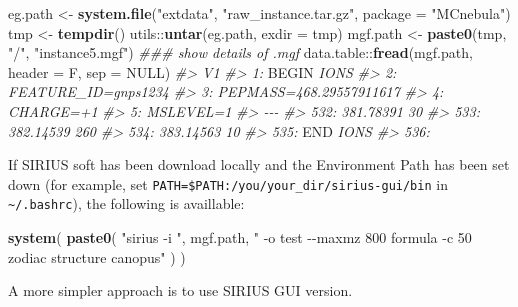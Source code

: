 \documentclass[]{tufte-handout}
\newenvironment{Shaded}{}{}
\newcommand{\CommentTok}[1]{\textcolor[rgb]{0.38,0.63,0.69}{\textit{#1}}}
\newcommand{\DataTypeTok}[1]{\textcolor[rgb]{0.56,0.13,0.00}{#1}}
\newcommand{\KeywordTok}[1]{\textcolor[rgb]{0.00,0.44,0.13}{\textbf{#1}}}
\newcommand{\NormalTok}[1]{#1}
\newcommand{\OperatorTok}[1]{\textcolor[rgb]{0.40,0.40,0.40}{#1}}
\newcommand{\OtherTok}[1]{\textcolor[rgb]{0.00,0.44,0.13}{#1}}
\newcommand{\RegionMarkerTok}[1]{#1}
\newcommand{\StringTok}[1]{\textcolor[rgb]{0.25,0.44,0.63}{#1}}
\begin{document}
\begin{Shaded}
\begin{Highlighting}[]
\NormalTok{eg.path \textless{}{-}}\StringTok{ }\KeywordTok{system.file}\NormalTok{(}\StringTok{"extdata"}\NormalTok{, }\StringTok{"raw\_instance.tar.gz"}\NormalTok{, }\DataTypeTok{package =} \StringTok{"MCnebula"}\NormalTok{)}
\NormalTok{tmp \textless{}{-}}\StringTok{ }\KeywordTok{tempdir}\NormalTok{()}
\NormalTok{utils}\OperatorTok{::}\KeywordTok{untar}\NormalTok{(eg.path, }\DataTypeTok{exdir =}\NormalTok{ tmp)}
\NormalTok{mgf.path \textless{}{-}}\StringTok{ }\KeywordTok{paste0}\NormalTok{(tmp, }\StringTok{"/"}\NormalTok{, }\StringTok{"instance5.mgf"}\NormalTok{)}
\CommentTok{\#\#\# show details of .mgf}
\NormalTok{data.table}\OperatorTok{::}\KeywordTok{fread}\NormalTok{(mgf.path, }\DataTypeTok{header =}\NormalTok{ F, }\DataTypeTok{sep =} \OtherTok{NULL}\NormalTok{)}
\CommentTok{\#\textgreater{}                           V1}
\CommentTok{\#\textgreater{}   1:              }\RegionMarkerTok{BEGIN}\CommentTok{ IONS}
\CommentTok{\#\textgreater{}   2:     FEATURE\_ID=gnps1234}
\CommentTok{\#\textgreater{}   3: PEPMASS=468.29557911617}
\CommentTok{\#\textgreater{}   4:               CHARGE=+1}
\CommentTok{\#\textgreater{}   5:               MSLEVEL=1}
\CommentTok{\#\textgreater{}  {-}{-}{-}                        }
\CommentTok{\#\textgreater{} 532:            381.78391 30}
\CommentTok{\#\textgreater{} 533:           382.14539 260}
\CommentTok{\#\textgreater{} 534:            383.14563 10}
\CommentTok{\#\textgreater{} 535:                }\RegionMarkerTok{END}\CommentTok{ IONS}
\CommentTok{\#\textgreater{} 536:}
\end{Highlighting}
\end{Shaded}

If SIRIUS soft has been download locally and the Environment Path has
been set down (for example, set
\texttt{PATH=\$PATH:/you/your\_dir/sirius-gui/bin} in
\texttt{\textasciitilde{}/.bashrc}), the following is availlable:

\begin{Shaded}
\begin{Highlighting}[]
\KeywordTok{system}\NormalTok{(}
  \KeywordTok{paste0}\NormalTok{(}
    \StringTok{"sirius {-}i "}\NormalTok{,}
\NormalTok{    mgf.path,}
    \StringTok{" {-}o test {-}{-}maxmz 800 formula {-}c 50 zodiac structure canopus"}
\NormalTok{    )}
\NormalTok{)}
\end{Highlighting}
\end{Shaded}

A more simpler approach is to use SIRIUS GUI version.
\end{document}
